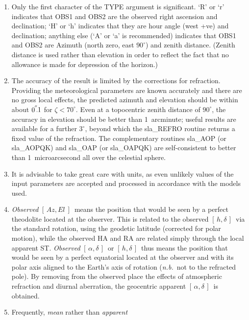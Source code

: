 \documentclass[11pt,twoside]{article}
\newcommand{\radec}     {$[\,\alpha,\delta\,]$}
\newcommand{\hadec}     {$[\,h,\delta\,]$}
\newcommand{\azel}      {$[\,Az,El~]$}
\newcommand{\arcsec}[2] {\arcseci{#1}$\hspace{-0.4em}.#2$}
\newcommand{\arcsec}[2] {
      {$#1\hspace{-0.05em}^{'\hspace{-0.1em}'}\hspace{-0.4em}.#2$}
   }
\newcommand{\arcseci}[1] {$#1\hspace{-0.05em}$\raisebox{-0.5ex}
                         {$^{'\hspace{-0.1em}'}$}}
\renewcommand{\arcseci}[1] {$#1\hspace{-0.05em}^{'\hspace{-0.1em}'}$}
\begin{document}
{
 \begin{enumerate}
  \item Only the first character of the TYPE argument is significant.
        `R' or `r' indicates that OBS1 and OBS2 are the observed right
        ascension and declination;  `H' or `h' indicates that they are
        hour angle (west +ve) and declination; anything else (`A' or
        `a' is recommended) indicates that OBS1 and OBS2 are Azimuth
        (north zero, east $90^{\circ}$) and zenith distance.  (Zenith
        distance is used rather than elevation in order to reflect the
        fact that no allowance is made for depression of the horizon.)
  \item The accuracy of the result is limited by the corrections for
        refraction.  Providing the meteorological parameters are
        known accurately and there are no gross local effects, the
        predicted azimuth and elevation should be within about
        \arcsec{0}{1} for $\zeta<70^{\circ}$.  Even
        at a topocentric zenith distance of
        $90^{\circ}$, the accuracy in elevation should be better than
        1~arcminute;  useful results are available for a further
        $3^{\circ}$, beyond which the sla\_REFRO routine returns a
        fixed value of the refraction.  The complementary
        routines sla\_AOP (or sla\_AOPQK) and sla\_OAP (or sla\_OAPQK)
        are self-consistent to better than 1~microarcsecond all over
        the celestial sphere.
  \item It is advisable to take great care with units, as even
        unlikely values of the input parameters are accepted and
        processed in accordance with the models used.
  \item {\it Observed}\/ \azel\ means the position that would be seen by a
        perfect theodolite located at the observer.  This is
        related to the observed \hadec\ via the standard rotation, using
        the geodetic latitude (corrected for polar motion), while the
        observed HA and RA are related simply through the local
        apparent ST.  {\it Observed}\/ \radec\ or \hadec\ thus means the
        position that would be seen by a perfect equatorial located
        at the observer and with its polar axis aligned to the
        Earth's axis of rotation ({\it n.b.}\ not to the refracted pole).
        By removing from the observed place the effects of
        atmospheric refraction and diurnal aberration, the
        geocentric apparent \radec\ is obtained.
  \item Frequently, {\it mean}\/ rather than {\it apparent}\,

\end{enumerate}}
\end{document}
